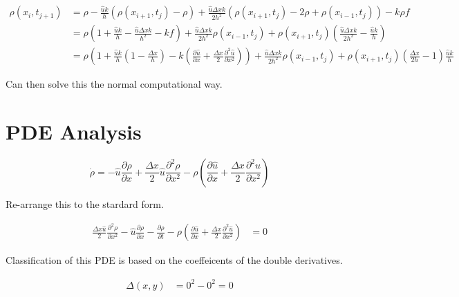 \documentclass[a4paper]{article}
\begin{document}
\begin{align*}
\rho ( x_i , t_{j+1}) & = \rho - \frac{\hat{u} k }{h} \left( \rho (x_{i+1} , t_j ) - \rho \right) + \frac{\hat{u} \Delta x k }{2 h ^2} \left( \rho ( x_{i + 1 }, t_j ) - 2 \rho + \rho ( x_{i-1} , t_j ) \right) - k \rho f \\
& = \rho \left( 1 + \frac{\hat{u } k }{h} - \frac{\hat{u} \Delta x k }{h^2} - kf \right) + \frac{\hat{u} \Delta x k }{2 h ^2} \rho ( x_{i-1} , t_j )  + \rho ( x_{i+1} , t_j ) \left( \frac{\hat{u} \Delta x k}{ 2 h ^2} - \frac{\hat{u} k}{h} \right) \\
& = \rho \left(1 + \frac{\hat{u} k }{h} \left(1 - \frac{\Delta x}{h} \right) - k \left( \frac{\partial \hat{u}}{\partial x} + \frac{\Delta x }{2} \frac{\partial ^2 \hat{u}}{\partial x^2} \right)  \right) + \frac{\hat{u} \Delta x k }{2 h ^2} \rho ( x_{i-1} , t_j ) + \rho ( x_{i+1} , t_j ) \left( \frac{\Delta x }{2h} - 1 \right) \frac{\hat{u} k }{h}
\end{align*}

Can then solve this the normal computational way.

\newpage

\section{PDE Analysis}

\begin{equation}
\dot{\rho} = - \hat{u} \frac{\partial \rho}{\partial x} + \frac{\Delta x}{2} \hat{u} \frac{\partial ^2 \rho}{\partial x ^2} - \rho \left( \frac{\partial \hat{u}}{\partial x} + \frac{\Delta x }{2} \frac{\partial ^2 \hat{u}}{\partial x^2} \right) 
\end{equation}

Re-arrange this to the stardard form. 

\begin{align*}
\frac{\Delta x \hat{u}}{2} \frac{\partial ^2 \rho }{\partial x ^2} - \hat{u} \frac{\partial \rho}{\partial x} - \frac{\partial \rho}{\partial t} - \rho \left( \frac{\partial \hat{u}}{\partial x} + \frac{\Delta x }{2} \frac{\partial ^2 \hat{u}}{\partial x^2} \right) & = 0 
\end{align*}

Classification of this PDE is based on the coeffeicents of the double derivatives. 

\begin{align*}
\Delta (x , y) & = 0 ^2 - 0^ 2 = 0
\end{align*}
\end{document}
